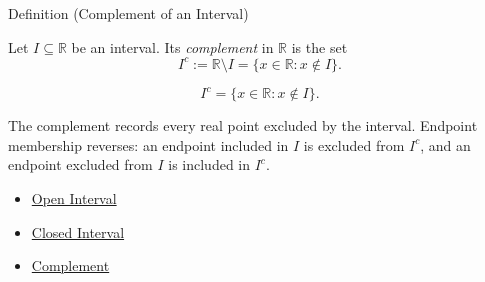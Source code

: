 \begin{definitionbox}{Definition (Complement of an Interval)}
\begin{definition}
\label{def:complement-of-interval}
Let $I\subseteq\mathbb{R}$ be an interval. Its \emph{complement} in
$\mathbb{R}$ is the set
\[
  I^{c}:=\mathbb{R}\setminus I
  =
  \{x\in\mathbb{R}:x\notin I\}.
\]
\end{definition}
\end{definitionbox}

\begin{remark*}
\[
I^c=\{x\in\mathbb{R}:x\notin I\}.
\]
\end{remark*}

\begin{remark*}[Interpretation]
The complement records every real point excluded by the interval. Endpoint
membership reverses: an endpoint included in $I$ is excluded from $I^c$, and an
endpoint excluded from $I$ is included in $I^c$.
\end{remark*}

\begin{dependencies}
\begin{itemize}
  \item \hyperref[def:open-interval]{Open Interval}
  \item \hyperref[def:closed-interval]{Closed Interval}
  \item \hyperref[def:complement]{Complement}
\end{itemize}
\end{dependencies}
